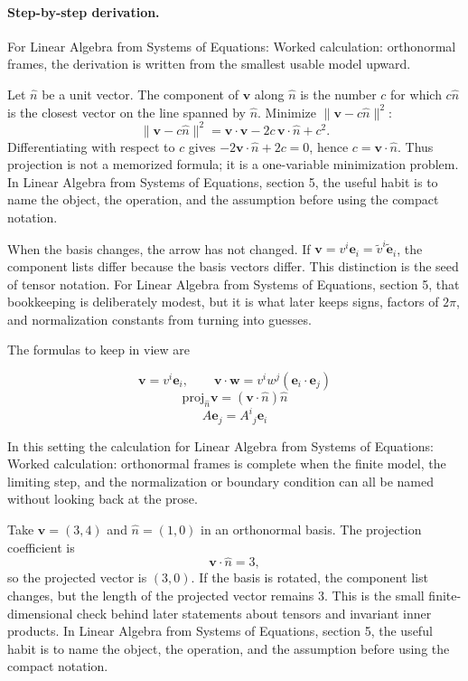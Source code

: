 \paragraph{Step-by-step derivation.}

For Linear Algebra from Systems of Equations: Worked calculation: orthonormal frames, the derivation is written from the smallest usable model upward.

Let \(\hat n\) be a unit vector.  The component of \(\bm v\) along \(\hat n\) is the number \(c\) for which \(c\hat n\) is the closest vector on the line spanned by \(\hat n\).  Minimize \(\|\bm v-c\hat n\|^2\):
\[
  \|\bm v-c\hat n\|^2=\bm v\cdot\bm v-2c\,\bm v\cdot\hat n+c^2.
\]
Differentiating with respect to \(c\) gives \(-2\bm v\cdot\hat n+2c=0\), hence \(c=\bm v\cdot\hat n\).  Thus projection is not a memorized formula; it is a one-variable minimization problem.  In Linear Algebra from Systems of Equations, section 5, the useful habit is to name the object, the operation, and the assumption before using the compact notation.

When the basis changes, the arrow has not changed.  If \(\bm v=v^i\bm e_i=\tilde v^i\tilde{\bm e}_i\), the component lists differ because the basis vectors differ.  This distinction is the seed of tensor notation.  For Linear Algebra from Systems of Equations, section 5, that bookkeeping is deliberately modest, but it is what later keeps signs, factors of \(2\pi\), and normalization constants from turning into guesses.

The formulas to keep in view are

\[
  \bm v=v^i\bm e_i,\qquad \bm v\cdot\bm w=v^iw^j(\bm e_i\cdot\bm e_j)
\]
\[
  \mathrm{proj}_{\hat n}\bm v=(\bm v\cdot\hat n)\hat n
\]
\[
  A\bm e_j=A^i{}_j\bm e_i
\]

In this setting the calculation for Linear Algebra from Systems of Equations: Worked calculation: orthonormal frames is complete when the finite model, the limiting step, and the normalization or boundary condition can all be named without looking back at the prose.




\begin{example}
Take \(\bm v=(3,4)\) and \(\hat n=(1,0)\) in an orthonormal basis.  The projection coefficient is
\[
  \bm v\cdot\hat n=3,
\]
so the projected vector is \((3,0)\).  If the basis is rotated, the component list changes, but the length of the projected vector remains \(3\).  This is the small finite-dimensional check behind later statements about tensors and invariant inner products.  In Linear Algebra from Systems of Equations, section 5, the useful habit is to name the object, the operation, and the assumption before using the compact notation.
\end{example}



